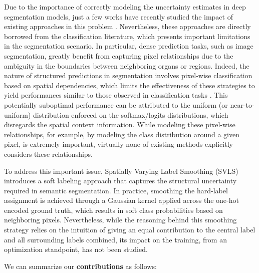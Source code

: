 \documentclass[twocolumn,final,10pt]{elsarticle}
\newcommand{\rev}[1]{{\color{black}#1}}
\begin{document}
\rev{Due to the importance of correctly modeling the uncertainty estimates in deep segmentation models, just a few works have recently studied the impact of existing approaches in this problem \citep{jena2019bayesian,larrazabal2021orthogonal,ding2021local,murugesan2022calibrating}. Nevertheless, these approaches are directly borrowed from the classification literature, which presents important limitations in the segmentation scenario. In particular, dense prediction tasks, such as image segmentation, greatly benefit from capturing pixel relationships due to the ambiguity in the boundaries between neighboring organs or regions. Indeed, the nature of structured predictions in segmentation involves pixel-wise classification based on spatial dependencies, which limits the effectiveness of these strategies to yield performances similar to those observed in classification tasks \citep{mukhoti2020calibrating,muller2019does,liu2022devil}. This potentially suboptimal performance can be attributed to the uniform (or near-to-uniform) distribution %
enforced on the softmax/logits distributions, which disregards the spatial context information. While modeling these pixel-wise relationships, for example, by modeling the class distribution around a given pixel, is extremely important, virtually none of existing methods explicitly considers these relationships. }

To address this important issue, Spatially Varying Label Smoothing (SVLS) \citep{islam2021spatially} introduces a soft labeling approach that captures the structural uncertainty required in semantic segmentation. %
In practice, smoothing the hard-label assignment is achieved through a Gaussian kernel applied across the one-hot encoded ground truth, which results in soft class probabilities based on neighboring pixels. Nevertheless, while the reasoning behind this smoothing strategy relies on the intuition of giving an equal contribution to the central label and all surrounding labels combined, its impact on the training, from an optimization standpoint, has not been studied. %

We can summarize our \textbf{contributions} as follows:
\end{document}
